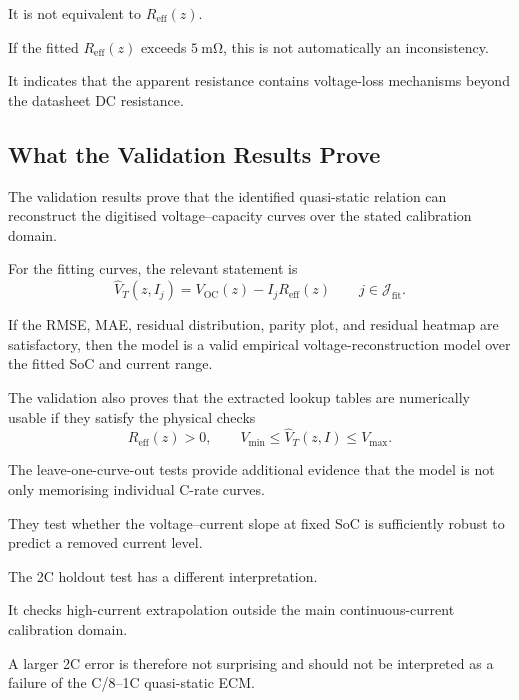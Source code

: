 \documentclass[a4paper,12pt]{article}
\begin{document}
It is not equivalent to \(R_{\mathrm{eff}}(z)\).

If the fitted \(R_{\mathrm{eff}}(z)\) exceeds \(\SI{5}{\milli\ohm}\), this is not automatically an inconsistency.

It indicates that the apparent resistance contains voltage-loss mechanisms beyond the datasheet DC resistance.

\subsection{What the Validation Results Prove}

The validation results prove that the identified quasi-static relation can reconstruct the digitised voltage--capacity curves over the stated calibration domain.

For the fitting curves, the relevant statement is
\begin{equation}
\hat{V}_T(z,I_j)
=
V_{\mathrm{OC}}(z)
-
I_jR_{\mathrm{eff}}(z)
\qquad
j\in\mathcal{J}_{\mathrm{fit}}.
\label{eq:interp_fit_domain_reconstruction}
\end{equation}

If the RMSE, MAE, residual distribution, parity plot, and residual heatmap are satisfactory, then the model is a valid empirical voltage-reconstruction model over the fitted SoC and current range.

The validation also proves that the extracted lookup tables are numerically usable if they satisfy the physical checks
\begin{equation}
R_{\mathrm{eff}}(z)>0,
\qquad
V_{\min}
\leq
\hat{V}_T(z,I)
\leq
V_{\max}.
\label{eq:interp_static_physical_checks}
\end{equation}

The leave-one-curve-out tests provide additional evidence that the model is not only memorising individual C-rate curves.

They test whether the voltage--current slope at fixed SoC is sufficiently robust to predict a removed current level.

The 2C holdout test has a different interpretation.

It checks high-current extrapolation outside the main continuous-current calibration domain.

A larger 2C error is therefore not surprising and should not be interpreted as a failure of the C/8--1C quasi-static ECM.

\end{document}
